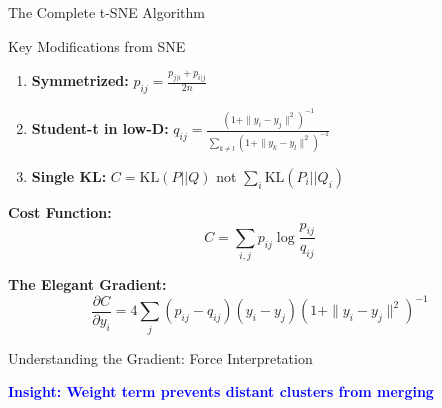 \documentclass[aspectratio=169]{beamer}
\newcommand{\conceptbox}[2]{\colorbox{#1!20}{\textcolor{#1}{\textbf{#2}}}}
\newcommand{\insight}[1]{\conceptbox{blue}{Insight: #1}}
\begin{document}
\begin{frame}{The Complete t-SNE Algorithm}
\begin{block}{Key Modifications from SNE}
\begin{enumerate}
\item \textbf{Symmetrized:} $p_{ij} = \frac{p_{j|i} + p_{i|j}}{2n}$
\item \textbf{Student-t in low-D:} $q_{ij} = \frac{(1+\|y_i-y_j\|^2)^{-1}}{\sum_{k \neq l}(1+\|y_k-y_l\|^2)^{-1}}$
\item \textbf{Single KL:} $C = \text{KL}(P||Q)$ not $\sum_i \text{KL}(P_i||Q_i)$
\end{enumerate}
\end{block}

\textbf{Cost Function:}
$$C = \sum_{i,j} p_{ij} \log\frac{p_{ij}}{q_{ij}}$$

\textbf{The Elegant Gradient:}
$$\frac{\partial C}{\partial y_i} = 4\sum_j (p_{ij} - q_{ij})(y_i - y_j)(1 + \|y_i - y_j\|^2)^{-1}$$
\end{frame}

\begin{frame}{Understanding the Gradient: Force Interpretation}
\begin{center}
\end{center}

\insight{Weight term prevents distant clusters from merging}
\end{frame}
\end{document}

